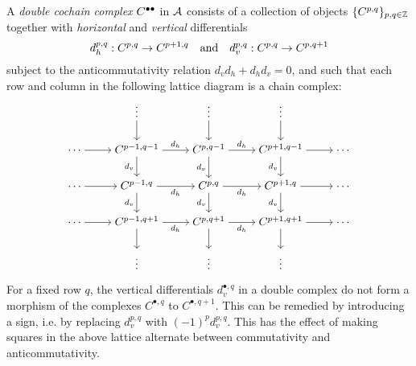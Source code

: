 \begin{definition}
  \label{def_double_complex}
  A \emph{double cochain complex} ${{C}}^{\bullet \bullet}$ in $\mathcal{A}$
  consists of a collection of objects $\{C^{p, q}\}_{p, q \in
  \mathbb{Z}}$ together with \emph{horizontal} and \emph{vertical} differentials
  \[
    d_h^{p, q}: C^{p, q} \to C^{p + 1, q}
    \quad \text{and} \quad
    d_v^{p, q}: C^{p, q} \to C^{p, q + 1}
  \]
  subject to the anticommutativity relation $d_v d_h + d_h d_v = 0$,
  and such that each row and column in the following lattice diagram
  is a chain complex:
  \[
    \begin{tikzcd}[cramped]
      & \vdots & \vdots & \vdots \\
      \cdots & {C^{p - 1, q - 1}} & {C^{p, q - 1}} & {C^{p + 1, q -
      1}} & \cdots \\
      \cdots & {C^{p - 1, q}} & {C^{p, q}} & {C^{p + 1, q}} & \cdots \\
      \cdots & {C^{p - 1, q + 1}} & {C^{p, q + 1}} & {C^{p + 1, q +
      1}} & \cdots \\
      & \vdots & \vdots & \vdots
      \arrow[from=1-2, to=2-2]
      \arrow[from=1-3, to=2-3]
      \arrow[from=1-4, to=2-4]
      \arrow[from=2-1, to=2-2]
      \arrow["{d_h}", from=2-2, to=2-3]
      \arrow["{d_v}"', from=2-2, to=3-2]
      \arrow["{d_h}", from=2-3, to=2-4]
      \arrow["{d_v}"', from=2-3, to=3-3]
      \arrow[from=2-4, to=2-5]
      \arrow["{d_v}"', from=2-4, to=3-4]
      \arrow[from=3-1, to=3-2]
      \arrow["{d_h}"', from=3-2, to=3-3]
      \arrow["{d_v}"', from=3-2, to=4-2]
      \arrow["{d_h}"', from=3-3, to=3-4]
      \arrow["{d_v}"', from=3-3, to=4-3]
      \arrow[from=3-4, to=3-5]
      \arrow["{d_v}"', from=3-4, to=4-4]
      \arrow[from=4-1, to=4-2]
      \arrow["{d_h}"', from=4-2, to=4-3]
      \arrow[from=4-2, to=5-2]
      \arrow["{d_h}"', from=4-3, to=4-4]
      \arrow[from=4-3, to=5-3]
      \arrow[from=4-4, to=4-5]
      \arrow[from=4-4, to=5-4]
    \end{tikzcd}
  \]
\end{definition}

\begin{remark}
  For a fixed row $q$, the vertical differentials $d_v^{\bullet, q}$
  in a double complex do not form a morphism of the complexes
  $C^{\bullet, q}$ to $C^{\bullet, q + 1}$.
  This can be remedied by introducing a sign, i.e. by replacing
  $d_v^{p, q}$ with $(-1)^p d_v^{p, q}$.
  This has the effect of making squares in the above lattice
  alternate between commutativity and anticommutativity.
\end{remark}
